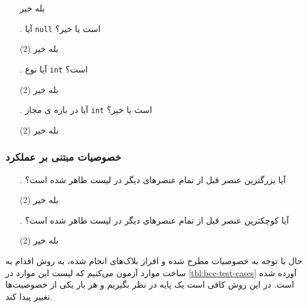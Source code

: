 \documentclass[twoside]{article}
\newenvironment{answer}{}{\medskip}
\begin{document}
\begin{answer}
\begin{enumerate}
\begin{tasks}
		\task[\lr{1}. ] بله
		\task[\lr{2}. ] خیر
	\end{tasks}
	\item[\lr{\textbf{G}}.]
آیا  \texttt{null} است یا خیر؟
	\begin{tasks}(2)
		\task[\lr{1}. ] بله
		\task[\lr{2}. ] خیر
	\end{tasks}
	\item[\lr{\textbf{H}}.]
آیا  نوع \texttt{int} است؟
	\begin{tasks}(2)
		\task[\lr{1}. ] بله
		\task[\lr{2}. ] خیر
	\end{tasks}
	\item[\lr{\textbf{I}}.]
آیا  در بازه ی مجاز \texttt{int} است یا خیر؟
	\begin{tasks}(2)
		\task[\lr{1}. ] بله
		\task[\lr{2}. ] خیر
	\end{tasks}
\end{enumerate}
\subsubsection*{خصوصیات مبتنی بر عملکرد}
\begin{enumerate}
	\item[\lr{\textbf{J}}.]
آیا بزرگترین عنصر قبل از تمام عنصرهای دیگر در لیست ظاهر شده است؟
	\begin{tasks}(2)
		\task[\lr{1}. ] بله
		\task[\lr{2}. ] خیر
	\end{tasks}
	\item[\lr{\textbf{K}}.]
آیا کوچکترین عنصر قبل از تمام عنصرهای دیگر در لیست ظاهر شده است؟
	\begin{tasks}(2)
		\task[\lr{1}. ] بله
		\task[\lr{2}. ] خیر
	\end{tasks}
\end{enumerate}
حال با توجه به خصوصیات مطرح شده و افراز بلاک‌های انجام شده، به روش %
اقدام به ساخت موارد آزمون می‌کنیم که لیست این موارد در \autoref{tbl:bcc-test-cases} آورده شده است. در این روش کافی است یک پایه در نظر بگیریم و هر بار یکی از خصوصیت‌ها تغییر پیدا کند.


\end{answer}
\end{document}
